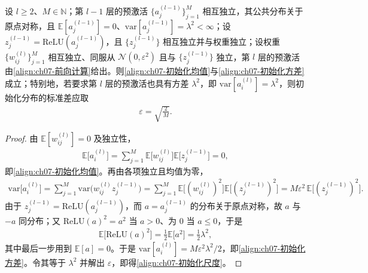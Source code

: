 \documentclass[../../main.tex]{subfiles}
\begin{document}
\begin{proposition}[He 初始化的方差传播]\label{proposition:ch07-初始化方差}
设 $l\geqslant2$、$M\in\mathbb{N}$；第 $l-1$ 层的预激活 $\{a_{j}^{(l-1)}\}_{j=1}^{M}$ 相互独立，其公共分布关于原点对称，且 $\mathbb{E}[a_{j}^{(l-1)}]=0$、$\mathrm{var}[a_{j}^{(l-1)}]=\lambda^{2}<\infty$；设 $z_{j}^{(l-1)}=\mathrm{ReLU}(a_{j}^{(l-1)})$，且 $\{z_{j}^{(l-1)}\}$ 相互独立并与权重独立；设权重 $\{w_{ij}^{(l)}\}_{j=1}^{M}$ 相互独立、同服从 $\mathcal{N}(0,\varepsilon^{2})$ 且与 $\{z_{j}^{(l-1)}\}$ 独立，第 $l$ 层的预激活由\eqref{align:ch07-前向计算}给出。则\eqref{align:ch07-初始化均值}与\eqref{align:ch07-初始化方差}成立；特别地，若要求第 $l$ 层的预激活也具有方差 $\lambda^{2}$，即 $\mathrm{var}[a_{i}^{(l)}]=\lambda^{2}$，则初始化分布的标准差应取
\begin{align}
\varepsilon = \sqrt{\frac{2}{M}}.
\label{align:ch07-初始化尺度}
\end{align}
\end{proposition}
\begin{proof}
由 $\mathbb{E}[w_{ij}^{(l)}]=0$ 及独立性，
\begin{align*}
\mathbb{E}\bigl[a_i^{(l)}\bigr] = \sum_{j=1}^{M}\mathbb{E}\bigl[w_{ij}^{(l)}\bigr]\mathbb{E}\bigl[z_j^{(l-1)}\bigr] = 0,
\end{align*}
即\eqref{align:ch07-初始化均值}。再由各项独立且均值为零，
\begin{align*}
\mathrm{var}\bigl[a_i^{(l)}\bigr] = \sum_{j=1}^{M}\mathrm{var}\bigl(w_{ij}^{(l)}z_j^{(l-1)}\bigr)
= \sum_{j=1}^{M}\mathbb{E}\bigl[(w_{ij}^{(l)})^{2}\bigr]\mathbb{E}\bigl[(z_j^{(l-1)})^{2}\bigr]
= M\varepsilon^{2}\,\mathbb{E}\bigl[(z_j^{(l-1)})^{2}\bigr].
\end{align*}
由于 $z_j^{(l-1)}=\mathrm{ReLU}(a_j^{(l-1)})$，而 $a=a_j^{(l-1)}$ 的分布关于原点对称，故 $a$ 与 $-a$ 同分布；又 $\mathrm{ReLU}(a)^{2}=a^{2}$ 当 $a>0$、为 $0$ 当 $a\leqslant0$，于是
\begin{align*}
\mathbb{E}\bigl[\mathrm{ReLU}(a)^{2}\bigr] = \frac{1}{2}\mathbb{E}\bigl[a^{2}\bigr] = \frac{1}{2}\lambda^{2},
\end{align*}
其中最后一步用到 $\mathbb{E}[a]=0$。于是 $\mathrm{var}[a_i^{(l)}]=M\varepsilon^{2}\lambda^{2}/2$，即\eqref{align:ch07-初始化方差}。令其等于 $\lambda^{2}$ 并解出 $\varepsilon$，即得\eqref{align:ch07-初始化尺度}。
\end{proof}
\end{document}

